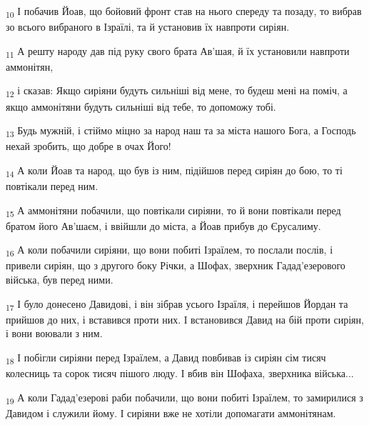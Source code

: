 \begin{tcolorbox}
\textsubscript{10} І побачив Йоав, що бойовий фронт став на нього спереду та позаду, то вибрав зо всього вибраного в Ізраїлі, та й установив їх навпроти сиріян.
\end{tcolorbox}
\begin{tcolorbox}
\textsubscript{11} А решту народу дав під руку свого брата Ав'шая, й їх установили навпроти аммонітян,
\end{tcolorbox}
\begin{tcolorbox}
\textsubscript{12} і сказав: Якщо сиріяни будуть сильніші від мене, то будеш мені на поміч, а якщо аммонітяни будуть сильніші від тебе, то допоможу тобі.
\end{tcolorbox}
\begin{tcolorbox}
\textsubscript{13} Будь мужній, і стіймо міцно за народ наш та за міста нашого Бога, а Господь нехай зробить, що добре в очах Його!
\end{tcolorbox}
\begin{tcolorbox}
\textsubscript{14} А коли Йоав та народ, що був із ним, підійшов перед сиріян до бою, то ті повтікали перед ним.
\end{tcolorbox}
\begin{tcolorbox}
\textsubscript{15} А аммонітяни побачили, що повтікали сиріяни, то й вони повтікали перед братом його Ав'шаєм, і ввійшли до міста, а Йоав прибув до Єрусалиму.
\end{tcolorbox}
\begin{tcolorbox}
\textsubscript{16} А коли побачили сиріяни, що вони побиті Ізраїлем, то послали послів, і привели сиріян, що з другого боку Річки, а Шофах, зверхник Гадад'езерового війська, був перед ними.
\end{tcolorbox}
\begin{tcolorbox}
\textsubscript{17} І було донесено Давидові, і він зібрав усього Ізраїля, і перейшов Йордан та прийшов до них, і вставився проти них. І встановився Давид на бій проти сиріян, і вони воювали з ним.
\end{tcolorbox}
\begin{tcolorbox}
\textsubscript{18} І побігли сиріяни перед Ізраїлем, а Давид повбивав із сиріян сім тисяч колесниць та сорок тисяч пішого люду. І вбив він Шофаха, зверхника війська...
\end{tcolorbox}
\begin{tcolorbox}
\textsubscript{19} А коли Гадад'езерові раби побачили, що вони побиті Ізраїлем, то замирилися з Давидом і служили йому. І сиріяни вже не хотіли допомагати аммонітянам.
\end{tcolorbox}
